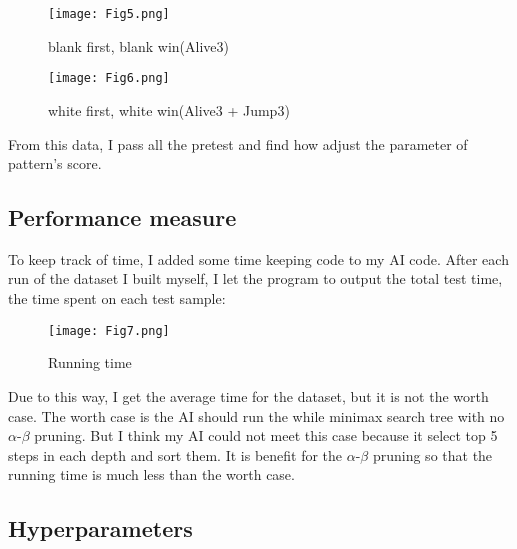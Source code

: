 \documentclass[10pt,twocolumn,letterpaper]{article}
\begin{document}
\begin{figure}[H]
  \centering
  \texttt{[image: Fig5.png]}\\
  \caption{blank first, blank win(Alive3)
}\label{straddltimeScale}
\end{figure}

\begin{figure}[H]
  \centering
  \texttt{[image: Fig6.png]}\\
  \caption{white first, white win(Alive3 + Jump3)
}\label{straddltimeScale}
\end{figure}

From this data, I pass all the pretest and find how adjust the parameter of pattern's score.

\subsection{Performance measure}
To keep track of time, I added some time keeping code to my AI code. After each run of the dataset I built myself, I let the program to output the total test time, the time spent on each test sample:

\begin{figure}[H]
  \centering
  \texttt{[image: Fig7.png]}\\
  \caption{Running time
}\label{straddltimeScale}
\end{figure}

Due to this way, I get the average time for the dataset, but it is not the worth case. The worth case is the AI should run the while minimax search tree with no $\alpha$-$\beta$ pruning. But I think my AI could not meet this case because it select top 5 steps in each depth and sort them. It is benefit for the $\alpha$-$\beta$ pruning so that the running time is much less than the worth case.

\subsection{Hyperparameters}
\end{document}
